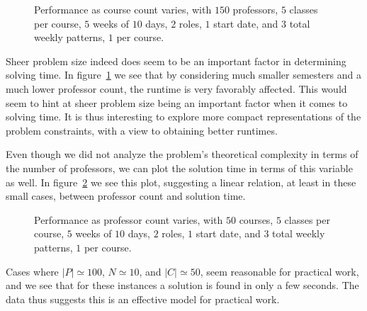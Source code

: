 \begin{figure}
  \begin{center}
    \caption{Performance as course count varies, with $150$ professors, $5$ classes per course, $5$ weeks of $10$ days, $2$ roles, $1$ start date, and $3$ total weekly patterns, $1$ per course.}
    \label{bench:megacourses2}
  \end{center}
\end{figure}

Sheer problem size indeed does seem to be an important factor in determining solving time. In figure~\ref{bench:megacourses2} we see that by considering much smaller semesters and a much lower professor count, the runtime is very favorably affected. This would seem to hint at sheer problem size being an important factor when it comes to solving time. It is thus interesting to explore more compact representations of the problem constraints, with a view to obtaining better runtimes.

Even though we did not analyze the problem's theoretical complexity in terms of the number of professors, we can plot the solution time in terms of this variable as well. In figure~\ref{bench:profs} we see this plot, suggesting a linear relation, at least in these small cases, between professor count and solution time.

\begin{figure}
  \begin{center}
    \caption{Performance as professor count varies, with $50$ courses, $5$ classes per course, $5$ weeks of $10$ days, $2$ roles, $1$ start date, and $3$ total weekly patterns, $1$ per course.}
    \label{bench:profs}
  \end{center}
\end{figure}

Cases where $|P| \simeq 100$, $N \simeq 10$, and $|C| \simeq 50$, seem reasonable for practical work, and we see that for these instances a solution is found in only a few seconds. The data thus suggests this is an effective model for practical work.


